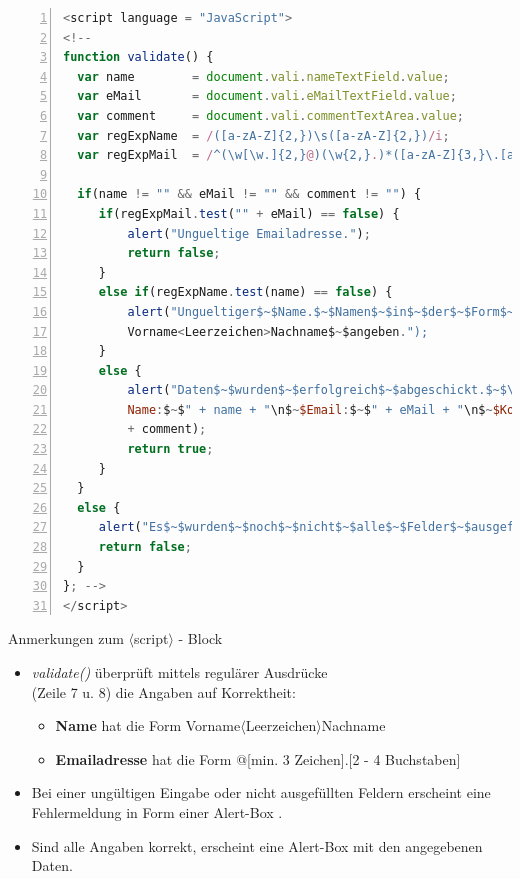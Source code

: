 \tiny{
\begin{lstlisting}[language = JavaScript,
				   mathescape = true, 
                   numbers = left, 
                   numbersep = 3pt]
<script language = "JavaScript">
<!--
function validate() {
  var name        = document.vali.nameTextField.value;
  var eMail       = document.vali.eMailTextField.value;
  var comment     = document.vali.commentTextArea.value;
  var regExpName  = /([a-zA-Z]{2,})\s([a-zA-Z]{2,})/i;
  var regExpMail  = /^(\w[\w.]{2,}@)(\w{2,}.)*([a-zA-Z]{3,}\.[a-zA-Z]{2,4})/$\$$i;
	
  if(name != "" && eMail != "" && comment != "") {
	 if(regExpMail.test("" + eMail) == false) {
		 alert("Ungueltige Emailadresse.");
		 return false;
	 }
	 else if(regExpName.test(name) == false) {
		 alert("Ungueltiger$~$Name.$~$Namen$~$in$~$der$~$Form$~$\n$~$
		 Vorname<Leerzeichen>Nachname$~$angeben.");
	 }	
	 else { 
		 alert("Daten$~$wurden$~$erfolgreich$~$abgeschickt.$~$\n$~$Ihre$~$Daten:$~$\n$~$
		 Name:$~$" + name + "\n$~$Email:$~$" + eMail + "\n$~$Kommentar:$~$" 
		 + comment);	
		 return true;	
	 }
  }
  else {
	 alert("Es$~$wurden$~$noch$~$nicht$~$alle$~$Felder$~$ausgefuellt.");
	 return false;
  }
}; -->
</script>
\end{lstlisting}}

\begin{frame}{Anmerkungen zum $\langle$script$\rangle$ - Block}
\small{
\begin{itemize}
\item {\it validate()} überprüft mittels regulärer Ausdrücke\\ (Zeile 7 u. 8) die Angaben auf Korrektheit:
	\begin{itemize}
	\item {\bf Name} hat die Form Vorname$\langle$Leerzeichen$\rangle$Nachname
	\item {\bf Emailadresse} hat die Form @[min. 3 Zeichen].[2 - 4 Buchstaben]
	\end{itemize}
\item Bei einer ungültigen Eingabe oder nicht ausgefüllten Feldern erscheint eine Fehlermeldung in Form einer Alert-Box .
\item Sind alle Angaben korrekt, erscheint eine Alert-Box mit den angegebenen Daten.
\end{itemize}}
\end{frame}
